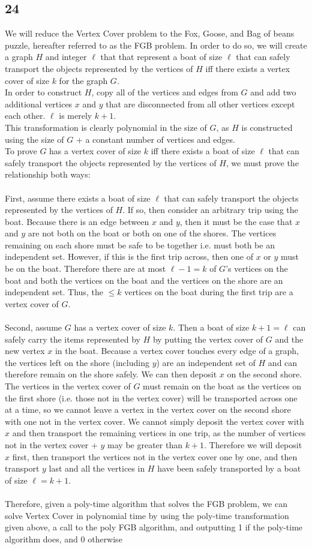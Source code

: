\documentclass[letterpaper,notitlepage,twoside]{article}
\begin{document}
\subsection*{24}
We will reduce the Vertex Cover problem to the Fox, Goose, and Bag of beans puzzle, hereafter referred to as the FGB problem. In order to do so, we will create a graph $H$ and integer $\ell$ that that represent a boat of size $\ell$ that can safely transport the objects represented by the vertices of $H$ iff there exists a vertex cover of size $k$ for the graph $G$. \\
In order to construct $H$, copy all of the vertices and edges from $G$ and add two additional vertices $x$ and $y$ that are disconnected from all other vertices except each other. $\ell$ is merely $k+1$. \\
This transformation is clearly polynomial in the size of $G$, as $H$ is constructed using the size of $G$ + a constant number of vertices and edges. \\
To prove $G$ has a vertex cover of size $k$ iff there exists a boat of size $\ell$ that can safely transport the objects represented by the vertices of $H$, we must prove the relationship both ways: \\\\
First, assume there exists a boat of size $\ell$ that can safely transport the objects represented by the vertices of $H$. If so, then consider an arbitrary trip using the boat. Because there is an edge between $x$ and $y$, then it must be the case that $x$ and $y$ are not both on the boat or both on one of the shores. The vertices remaining on each shore must be safe to be together i.e. must both be an independent set. However, if this is the first trip across, then one of $x$ or $y$ must be on the boat. Therefore there are at most $\ell - 1 = k$ of $G$'s vertices on the boat and both the vertices on the boat and the vertices on the shore are an independent set. Thus, the $\leq k$ vertices on the boat during the first trip are a vertex cover of $G$. \\\\ 
Second, assume $G$ has a vertex cover of size $k$. Then a boat of size $k+1=\ell$ can safely carry the items represented by $H$ by putting the vertex cover of $G$ and the new vertex $x$ in the boat. Because a vertex cover touches every edge of a graph, the vertices left on the shore (including $y$) are an independent set of $H$ and can therefore remain on the shore safely. We can then deposit $x$ on the second shore. The vertices in the vertex cover of $G$ must remain on the boat as the vertices on the first shore (i.e. those not in the vertex cover) will be transported across one at a time, so we cannot leave a vertex in the vertex cover on the second shore with one not in the vertex cover. We cannot simply deposit the vertex cover with $x$ and then transport the remaining vertices in one trip, as the number of vertices not in the vertex cover + $y$ may be greater than $k+1$. Therefore we will deposit $x$ first, then transport the vertices not in the vertex cover one by one, and then transport $y$ last and all the vertices in $H$ have been safely transported by a boat of size $\ell = k+1$.\\\\
Therefore, given a poly-time algorithm that solves the FGB problem, we can solve Vertex Cover in polynomial time by using the poly-time transformation given above, a call to the poly FGB algorithm, and outputting 1 if the poly-time algorithm does, and 0 otherwise
\end{document}
